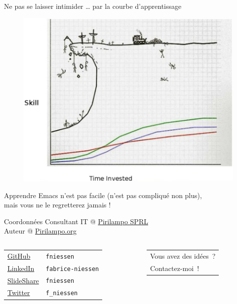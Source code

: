\documentclass[t]{beamer}
\begin{document}
\begin{frame}[label={sec:orgdd0413a}]{Ne pas se laisser intimider}
\ldots{} par la courbe d'apprentissage

\begin{figure}[!htbp]
\centering
\includegraphics[width=.52\linewidth]{images/courbe-apprentissage.png}
\end{figure}

Apprendre Emacs n'est pas facile (n'est pas compliqué non plus), \\
mais \alert{vous ne le regretterez jamais} !
\end{frame}

\begin{frame}[fragile,label={sec:org0e0d921}]{Coordonnées}
 Consultant IT @ \href{http://www.pirilampo.be/}{Pirilampo SPRL} \\
Auteur @ \href{http://www.pirilampo.org/}{Pirilampo.org}

\vfill{}

\begin{columns}
\begin{column}{0.48\columnwidth}
\begin{center}
\begin{tabular}{ll}
\href{https://github.com/fniessen}{GitHub} & \texttt{fniessen}\\
\href{http://be.linkedin.com/pub/fabrice-niessen/0/a42/200}{LinkedIn} & \texttt{fabrice-niessen}\\
\href{http://www.slideshare.net/fniessen}{SlideShare} & \texttt{fniessen}\\
\href{https://twitter.com/f\_niessen}{Twitter} & \texttt{f\_niessen}\\
\end{tabular}
\end{center}
\end{column}

\begin{column}{0.48\columnwidth}
\begin{center}
\begin{tabular}{l}
Vous avez des idées~?\\
Contactez-moi~!\\
\end{tabular}
\end{center}
\end{column}
\end{columns}
\end{frame}
\end{document}
